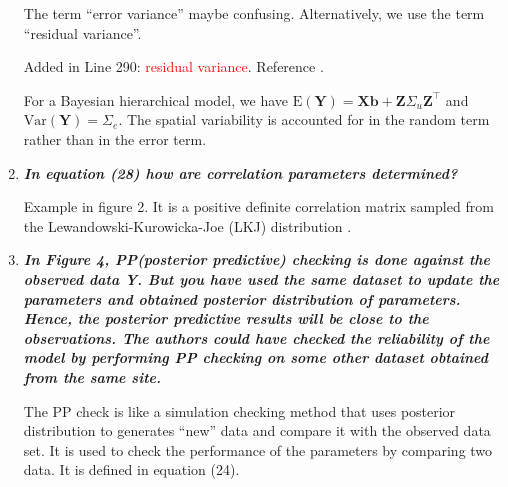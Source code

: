 \documentclass[a4paper]{article}   	%
\newcommand{\E}{\mathrm{E}}
\newcommand{\Var}{\mathrm{Var}}
\newcommand{\qtitle}[1]{\textit{\textbf{#1}}}
\begin{document}
\begin{enumerate}
	The term ``error variance'' maybe confusing. Alternatively, we use the term ``residual variance''. 
	
	Added in Line 290: \textcolor{red}{residual variance}. Reference \textcite{Gabry2019Visualization}. 
	
	For a Bayesian hierarchical model, we have $\E(\bm{Y}) = \bm{X}\bm{b} + \bm{Z}\Sigma_u\bm{Z}^\top$ and $\Var(\bm{Y}) = \Sigma_e$. The spatial variability is accounted for in the random term rather than in the error term. 
    
    \item \qtitle{In equation (28) how are correlation parameters determined?}
    
    Example in figure 2. It is a positive definite correlation matrix sampled from the Lewandowski-Kurowicka-Joe (LKJ) distribution \parencite{Lewandowski2009Generating, McElreath2015Statistical}. 
    
    \item \qtitle{In Figure 4, PP(posterior predictive) checking is done against the observed data Y. But you have used the same dataset to update the parameters and obtained posterior distribution of parameters. Hence, the posterior predictive results will be close to the observations. The authors could have checked the reliability of the model by performing PP checking on some other dataset obtained from the same site.}
    
    The PP check is like a simulation checking method that uses posterior distribution to generates ``new'' data and compare it with the observed data set. It is used to check the performance of the parameters by comparing two data. It is defined in equation (24). 
    
    
\end{enumerate}

\renewcommand\bibname{References}%
\printbibliography
\end{document}
